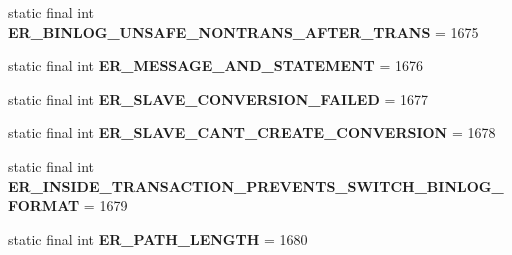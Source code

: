 \begin{DoxyCompactItemize}
\item 
\mbox{\label{classcom_1_1mysql_1_1cj_1_1exceptions_1_1_mysql_error_numbers_a03b6a62f76ae11172ca2ef9562fe60c0}} 
static final int {\bfseries E\+R\+\_\+\+B\+I\+N\+L\+O\+G\+\_\+\+U\+N\+S\+A\+F\+E\+\_\+\+N\+O\+N\+T\+R\+A\+N\+S\+\_\+\+A\+F\+T\+E\+R\+\_\+\+T\+R\+A\+NS} = 1675
\item 
\mbox{\label{classcom_1_1mysql_1_1cj_1_1exceptions_1_1_mysql_error_numbers_a2f4c5e1b8b8a730a517898db01bcac35}} 
static final int {\bfseries E\+R\+\_\+\+M\+E\+S\+S\+A\+G\+E\+\_\+\+A\+N\+D\+\_\+\+S\+T\+A\+T\+E\+M\+E\+NT} = 1676
\item 
\mbox{\label{classcom_1_1mysql_1_1cj_1_1exceptions_1_1_mysql_error_numbers_ade76f31c45756776be6ca6da4e085a57}} 
static final int {\bfseries E\+R\+\_\+\+S\+L\+A\+V\+E\+\_\+\+C\+O\+N\+V\+E\+R\+S\+I\+O\+N\+\_\+\+F\+A\+I\+L\+ED} = 1677
\item 
\mbox{\label{classcom_1_1mysql_1_1cj_1_1exceptions_1_1_mysql_error_numbers_af530fad19b63ba0b9c85f95b9a543fd1}} 
static final int {\bfseries E\+R\+\_\+\+S\+L\+A\+V\+E\+\_\+\+C\+A\+N\+T\+\_\+\+C\+R\+E\+A\+T\+E\+\_\+\+C\+O\+N\+V\+E\+R\+S\+I\+ON} = 1678
\item 
\mbox{\label{classcom_1_1mysql_1_1cj_1_1exceptions_1_1_mysql_error_numbers_ae34619d826b4a77914fa9dc7065b5cad}} 
static final int {\bfseries E\+R\+\_\+\+I\+N\+S\+I\+D\+E\+\_\+\+T\+R\+A\+N\+S\+A\+C\+T\+I\+O\+N\+\_\+\+P\+R\+E\+V\+E\+N\+T\+S\+\_\+\+S\+W\+I\+T\+C\+H\+\_\+\+B\+I\+N\+L\+O\+G\+\_\+\+F\+O\+R\+M\+AT} = 1679
\item 
\mbox{\label{classcom_1_1mysql_1_1cj_1_1exceptions_1_1_mysql_error_numbers_a99365d8b4aeac42fa2577c3fd7eb1d9c}} 
static final int {\bfseries E\+R\+\_\+\+P\+A\+T\+H\+\_\+\+L\+E\+N\+G\+TH} = 1680
\item 
\mbox{\label{classcom_1_1mysql_1_1cj_1_1exceptions_1_1_mysql_error_numbers_a8dd5661af87ee57060d7f6370b10cf68}} 

\end{DoxyCompactItemize}
